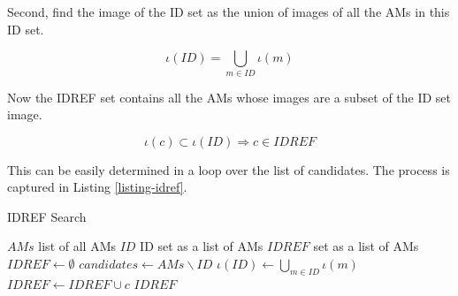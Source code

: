 Second, find the image of the ID set as the union of images of all the AMs in this ID set.

\[\iota(ID) = \bigcup_{m \in ID} \iota(m)\]

Now the IDREF set contains all the AMs whose images are a subset of the ID set image.

\[\iota(c) \subset \iota(ID) \Rightarrow c \in IDREF\]

This can be easily determined in a loop over the list of candidates. The process is captured in Listing \ref{listing-idref}.

\begin{algorithm}
\caption{IDREF Search}
\label{listing-idref}
\begin{algorithmic}
\REQUIRE $AMs$ list of all AMs
\REQUIRE $ID$ ID set as a list of AMs
\ENSURE $IDREF$ set as a list of AMs
\STATE $IDREF \gets \emptyset$
\STATE $candidates \gets AMs \backslash ID$
\STATE $\iota(ID) \gets \bigcup_{m \in ID} \iota(m)$
    \STATE $IDREF \gets IDREF \cup c$
  \ENDIF
\ENDFOR
\RETURN $IDREF$
\end{algorithmic}
\end{algorithm}
